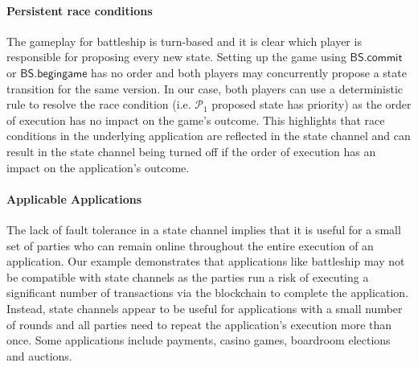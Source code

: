 \documentclass{llncs}
\newcommand{\participant}{\mathcal{P}}
\newcommand{\battleshipbegin}{\mathsf{BS.begingame}}
\newcommand{\battleshipcommit}{\mathsf{BS.commit}}
\begin{document}
\paragraph{Persistent race conditions} 
The gameplay for battleship is turn-based and it is clear which player is responsible for proposing every new state. 
Setting up the game using $\battleshipcommit$ or $\battleshipbegin$ has no order and both players may concurrently propose a state transition for the same version. 
In our case, both players can use a deterministic rule to resolve the race condition (i.e. $\participant_{1}$ proposed state has priority) as the order of execution has no impact on the game's outcome. 
This highlights that race conditions in the underlying application are reflected in the state channel and can result in the state channel being turned off if the order of execution has an impact on the application's outcome. 
%

\paragraph{Applicable Applications} 
The lack of fault tolerance in a state channel implies that it is useful for a small set of parties who can remain online throughout the entire execution of an application. 
Our example demonstrates that applications like battleship may not be compatible with state channels as the parties run a risk of executing a significant number of transactions via the blockchain to complete the application. 
Instead, state channels appear to be useful for applications  with a small number of rounds and all parties need to repeat the application's execution more than once. 
Some applications include payments, casino games, boardroom elections and auctions.
\end{document}
